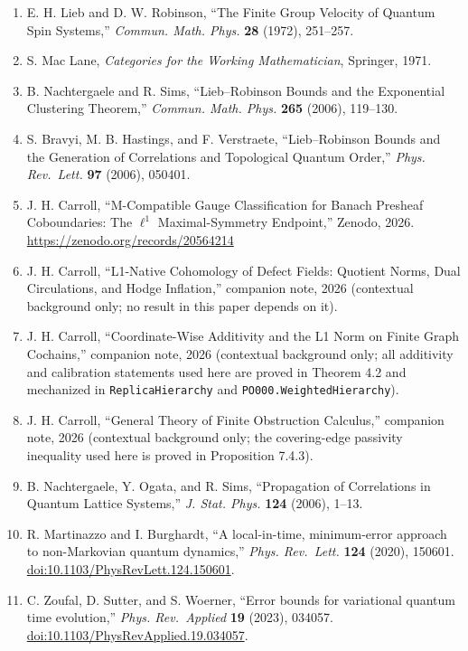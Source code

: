 \documentclass[
  11pt,
]{article}
\providecommand{\tightlist}{%
  \setlength{\itemsep}{0pt}\setlength{\parskip}{0pt}}
\providecommand{\tightlist}{%
  \setlength{\itemsep}{0pt}\setlength{\parskip}{0pt}}
\begin{document}
\begin{enumerate}
\def\labelenumi{\arabic{enumi}.}
\tightlist
\item
  E. H. Lieb and D. W. Robinson, ``The Finite Group Velocity of Quantum Spin Systems,'' \emph{Commun. Math. Phys.} \textbf{28} (1972), 251--257.
\item
  S. Mac Lane, \emph{Categories for the Working Mathematician}, Springer, 1971.
\item
  B. Nachtergaele and R. Sims, ``Lieb--Robinson Bounds and the Exponential Clustering Theorem,'' \emph{Commun. Math. Phys.} \textbf{265} (2006), 119--130.
\item
  S. Bravyi, M. B. Hastings, and F. Verstraete, ``Lieb--Robinson Bounds and the Generation of Correlations and Topological Quantum Order,'' \emph{Phys. Rev.~Lett.} \textbf{97} (2006), 050401.
\item
  J. H. Carroll, ``M-Compatible Gauge Classification for Banach Presheaf Coboundaries: The \(\ell^1\) Maximal-Symmetry Endpoint,'' Zenodo, 2026. \url{https://zenodo.org/records/20564214}
\item
  J. H. Carroll, ``L1-Native Cohomology of Defect Fields: Quotient Norms, Dual Circulations, and Hodge Inflation,'' companion note, 2026 (contextual background only; no result in this paper depends on it).
\item
  J. H. Carroll, ``Coordinate-Wise Additivity and the L1 Norm on Finite Graph Cochains,'' companion note, 2026 (contextual background only; all additivity and calibration statements used here are proved in Theorem 4.2 and mechanized in \texttt{ReplicaHierarchy} and \texttt{PO000.WeightedHierarchy}).
\item
  J. H. Carroll, ``General Theory of Finite Obstruction Calculus,'' companion note, 2026 (contextual background only; the covering-edge passivity inequality used here is proved in Proposition 7.4.3).
\item
  B. Nachtergaele, Y. Ogata, and R. Sims, ``Propagation of Correlations in Quantum Lattice Systems,'' \emph{J. Stat. Phys.} \textbf{124} (2006), 1--13.
\item
  R. Martinazzo and I. Burghardt, ``A local-in-time, minimum-error approach to non-Markovian quantum dynamics,'' \emph{Phys. Rev.~Lett.} \textbf{124} (2020), 150601. \href{https://doi.org/10.1103/PhysRevLett.124.150601}{doi:10.1103/PhysRevLett.124.150601}.
\item
  C. Zoufal, D. Sutter, and S. Woerner, ``Error bounds for variational quantum time evolution,'' \emph{Phys. Rev.~Applied} \textbf{19} (2023), 034057. \href{https://doi.org/10.1103/PhysRevApplied.19.034057}{doi:10.1103/PhysRevApplied.19.034057}.

\end{enumerate}
\end{document}
